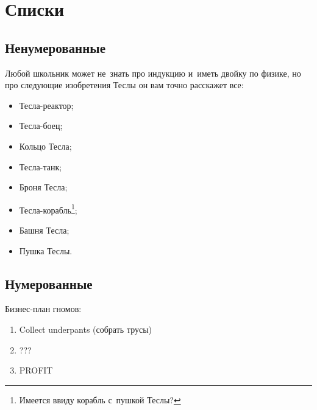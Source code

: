 \documentclass[12pt]{article}
\begin{document}
\section{Списки}

\subsection{Ненумерованные}

Любой школьник может не~знать про индукцию и~иметь двойку по физике, но про следующие изобретения Теслы он вам точно расскажет все:
\begin{itemize}
\item Тесла-реактор;
\item Тесла-боец;
\item Кольцо Тесла;
\item Тесла-танк;
\item Броня Тесла;
\item Тесла-корабль\footnote{Имеется ввиду корабль с~пушкой Теслы?};
\item Башня Тесла;
\item Пушка Теслы.
\end{itemize}

\subsection{Нумерованные}

Бизнес-план гномов:
\begin{enumerate}
\item Collect underpants (собрать трусы)
\item ???
\item PROFIT
\end{enumerate}
\end{document}
